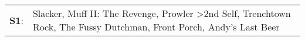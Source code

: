 \begin{supertabular}{p{0.03\textwidth}p{0.92\textwidth}}
 \textbf{S1}:  &  Slacker\textsuperscript{}, \enspace Muff II: The Revenge\textsuperscript{}, \enspace Prowler\textsuperscript{} \textgreater \enspace 2nd Self\textsuperscript{}, \enspace Trenchtown Rock\textsuperscript{}, \enspace The Fussy Dutchman\textsuperscript{}, \enspace Front Porch\textsuperscript{}, \enspace Andy's Last Beer\textsuperscript{}  \enspace  \\
\end{supertabular}
